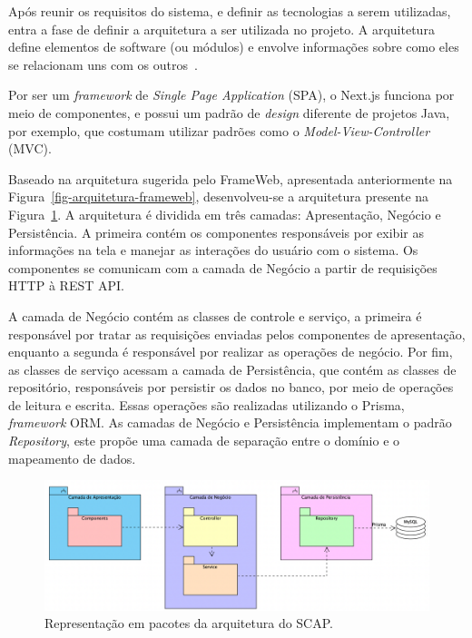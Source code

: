 Após reunir os requisitos do sistema, e definir as tecnologias a serem utilizadas, entra a fase 
de definir a arquitetura a ser utilizada no projeto. A arquitetura define elementos
de software (ou módulos) e envolve informações sobre como eles se relacionam uns com os outros~\cite{falbo:2018}.

Por ser um \textit{framework} de \textit{Single Page Application} (SPA), o Next.js funciona por meio de componentes,
e possui um padrão de \textit{design} diferente de projetos Java, por exemplo, que costumam utilizar
padrões como o \textit{Model-View-Controller} (MVC). 

Baseado na arquitetura sugerida pelo FrameWeb, apresentada anteriormente na Figura~\ref{fig-arquitetura-frameweb}, 
desenvolveu-se a arquitetura presente na Figura~\ref{fig-arquitetura}.
A arquitetura é dividida em três camadas: Apresentação, Negócio e Persistência.
A primeira contém os componentes responsáveis por exibir as informações na tela e manejar as interações do usuário
com o sistema. Os componentes se comunicam com a camada de Negócio a partir de requisições HTTP à REST API.

A camada de Negócio contém as classes de controle e serviço, a primeira é responsável por tratar as requisições
enviadas pelos componentes de apresentação, enquanto a segunda é responsável por realizar as operações de negócio.
Por fim, as classes de serviço acessam a camada de Persistência, que contém as classes de repositório, responsáveis por
persistir os dados no banco, por meio de operações de leitura e escrita. Essas operações são realizadas utilizando o Prisma,
\textit{framework} ORM. As camadas de Negócio e Persistência implementam o padrão \textit{Repository}, este propõe uma
camada de separação entre o domínio e o mapeamento de dados.

\begin{figure}[h!]
    \centering
    \includegraphics[width=\textwidth]{figuras/fig-arquitetura.png}
    \caption{Representação em pacotes da arquitetura do SCAP.}
    \label{fig-arquitetura}
\end{figure}


